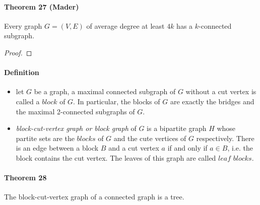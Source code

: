 \paragraph{Theorem 27 (Mader)} Every graph $ G = (V,E) $ of average degree at least $ 4k $
has a $k$-connected subgraph.
\begin{proof}
    
\end{proof}

\paragraph{Definition}
\begin{itemize}
    \item let $ G $ be a graph, a maximal connected subgraph of $ G $ without a 
    cut vertex is called a $block$ of $ G$. In particular, the blocks of $ G $ 
    are exactly the bridges and the maximal 2-connected subgraphs of $ G$.
    \item \textit{block-cut-vertex graph or block graph} of $ G $ is a bipartite
    graph $ H $ whose partite sets are the $blocks$ of $ G $ and the cute vertices
    of $ G $ respectively. There is an edge between a block $ B $ and a cut vertex 
    $ a $ if and only if $ a \in B $, i.e. the block contains the cut vertex. The 
    leaves of this graph are called $leaf$ $blocks$.
\end{itemize}

\paragraph{Theorem 28} The block-cut-vertex graph of a connected graph is a tree.
